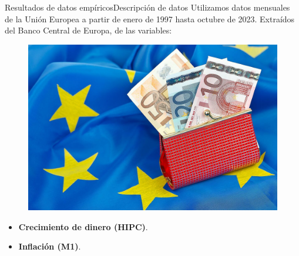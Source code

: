 \documentclass[11pt]{beamer}
\begin{document}
    \begin{frame}{Resultados de datos empíricos}{Descripción de datos}
	Utilizamos datos mensuales de la Unión Europea a partir de enero de 1997 hasta octubre de 2023. Extraídos del Banco Central de Europa, de las variables:
	\begin{multicols}{2}
	     \begin{figure}
		 \includegraphics[scale=0.18]{euroZona.jpg}
	     \end{figure}
	\begin{itemize}
	    \item \textbf{Crecimiento de dinero (HIPC)}.
	\item \textbf{Inflación (M1)}.
	\end{itemize}
	\end{multicols}
    \end{frame}
\end{document}
